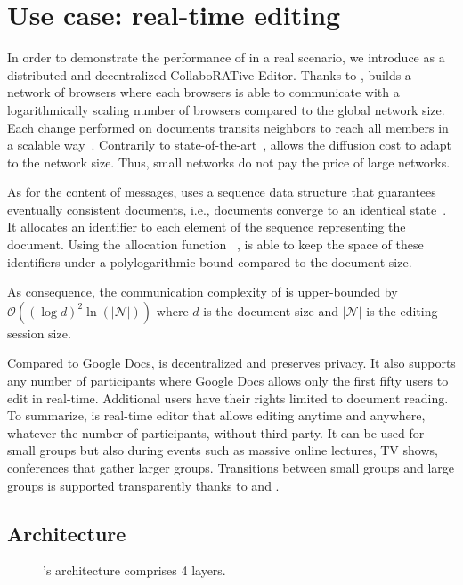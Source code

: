 
\section{Use case: real-time editing}
\label{sec:use-case}

In order to demonstrate the performance of \SPRAY in a real scenario,
we introduce \CRATE as a distributed and decentralized CollaboRATive
Editor. Thanks to \SPRAY, \CRATE builds a network of
browsers where each browsers is able to communicate with a
logarithmically scaling number of browsers compared to the global
network size. Each change performed on documents transits
neighbors to reach all members in a scalable
way~\cite{birman1999bimodal}. Contrarily to
state-of-the-art~\cite{tolgyeski2009adaptive, voulgaris2005cyclon},
\SPRAY allows the diffusion cost to adapt to the network size. Thus,
small networks do not pay the price of large networks.

As for the content of messages, \CRATE uses a sequence data structure
that guarantees eventually consistent documents, i.e., documents
converge to an identical state~\cite{bailis2013eventual}. It allocates
an identifier to each element of the sequence representing the
document. Using the allocation function \LSEQ~\cite{nedelec2013lseq},
\CRATE is able to keep the space of these identifiers under a
polylogarithmic bound compared to the document size.

As consequence, the communication complexity of \CRATE is
upper-bounded by $\mathcal{O}((\log d)^2\ln(|\mathcal{N}|))$ where $d$
is the document size and $|\mathcal{N}|$ is the editing session size.

Compared to Google Docs, \CRATE is decentralized and preserves privacy. It also
supports any number of participants where Google Docs allows only the first
fifty users to edit in real-time. Additional users have their rights limited to
document reading.  To summarize, \CRATE is real-time editor that allows editing
anytime and anywhere, whatever the number of participants, without third
party. It can be used for small groups but also during events such as massive
online lectures, TV shows, conferences that gather larger groups. Transitions
between small groups and large groups is supported transparently thanks to
\SPRAY and \LSEQ.

\subsection{Architecture}

\begin{figure}
  \centering
  
  \caption{\label{fig:architecture}\CRATE's architecture comprises 4
    layers.}
\end{figure}

